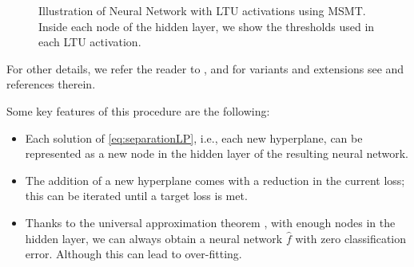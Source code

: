 \begin{figure}
    \centering
{}
\caption{Illustration of Neural Network with LTU activations using MSMT. Inside each node of the hidden layer, we show the thresholds used in each LTU activation.}
    \label{fig:HyperplaneToNN}
\end{figure}
%
For other details, we refer the reader to \cite{bennett1992decision}, and for variants and extensions see \cite{mangasarian1993mathematical} and references therein.

Some key features of this procedure are the following:
\begin{itemize}
    \item Each solution of \eqref{eq:separationLP}, i.e., each new hyperplane, can be represented as a new node in the hidden layer of the resulting neural network.
    \item The addition of a new hyperplane comes with a reduction in the current loss; this can be iterated until a target loss is met.
    \item Thanks to the universal approximation theorem \citep{Hornik1989}, with enough nodes in the hidden layer, we can always obtain a neural network $\hat{f}$ with zero classification error. Although this can lead to over-fitting.\\
\end{itemize}


